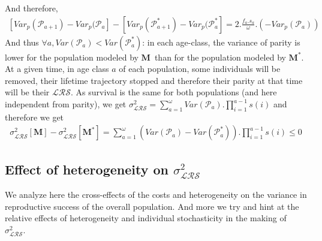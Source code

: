 \documentclass[10pt,a4paper]{article}
\newcommand{\M}{$\mathbf{M}$}
\newcommand{\LRO}{$\mathcal{LRS}$}
\newcommand{\PCoR}{\emph{individual} costs}
\newcommand{\Ma}{$\mathbf{M^{fold}_{age}}$}
\newcommand{\Map}{$\mathbf{M^{fold}_{age,parity}}$}
\newcommand{\vLRO}{$\sigma_{\mathrm{\mathcal{LRS}}}^2$}
\begin{document}
And therefore, 
\begin{eqnarray}
\left[ Var_{p}(\mathcal{P}_{a+1}) - Var_{p}(\mathcal{P}_{a}\right] - \left[ Var_{p}(\mathcal{P}^{*}_{a+1}) - Var_{p}(\mathcal{P}^{*}_{a}\right] =2.\frac{f_{a}.s_{a}}{\omega}.(-Var_{p}(\mathcal{P}_{a}))
\label{eq:vardiff}
\end{eqnarray}
And thus $\forall a,  Var(\mathcal{P}_{a})<Var(\mathcal{P}^{*}_{a})$: in  each age-class, the variance of parity is lower for the population modeled by \M\ than for the population modeled by $\mathbf{M^{*}}$. 
At a given time, in age class $a$ of each population, some individuals will be removed, their lifetime trajectory stopped and therefore their parity at that time will be their \LRO.  As survival is the same for both populations (and here independent from parity), we get $\sigma^{2}_{\mathcal{LRS}}=\sum_{a=1}^{\omega} Var(\mathcal{P}_{a}).\prod_{i=1}^{a-1}s(i)$ and therefore we get 
\begin{eqnarray}
 \sigma^{2}_{\mathcal{LRS}}\left[ \mathbf{M}\right] -\sigma^{2}_{\mathcal{LRS}}\left[ \mathbf{M^{*}}\right]=\sum_{a=1}^{\omega} (Var(\mathcal{P}_{a})-Var(\mathcal{P}^{*}_{a})).\prod_{i=1}^{a-1}s(i) \leq 0
\label{eq:demons} 
 \end{eqnarray} 



\subsection{Effect of heterogeneity on \vLRO}  
\label{sec:heterovlro}

We analyze here the cross-effects of the costs and heterogeneity on the variance in reproductive success of the overall population. And more we try and hint at the relative effects of heterogeneity and individual stochasticity in the making of \vLRO.
\end{document}
